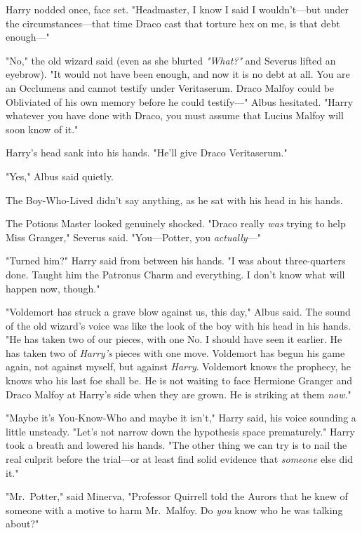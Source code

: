 Harry nodded once, face set. "Headmaster, I know I said I wouldn't---but under
the circumstances---that time Draco cast that torture hex on me, is that debt
enough\mbox{---}"

"No," the old wizard said (even as she blurted \emph{"What?"} and Severus
lifted an eyebrow). "It would not have been enough, and now it is no debt at
all. You are an Occlumens and cannot testify under Veritaserum. Draco Malfoy
could be Obliviated of his own memory before he could testify\mbox{---}" Albus
hesitated. "Harry{\el} whatever you have done with Draco, you must assume
that Lucius Malfoy will soon know of it."

Harry's head sank into his hands. "He'll give Draco Veritaserum."

"Yes," Albus said quietly.

The Boy-Who-Lived didn't say anything, as he sat with his head in his hands.

The Potions Master looked genuinely shocked. "Draco really \emph{was} trying to
help Miss Granger," Severus said. "You---Potter, you \emph{actually}\mbox{---}"

"Turned him?" Harry said from between his hands. "I was about three-quarters
done. Taught him the Patronus Charm and everything. I don't know what will
happen now, though."

"Voldemort has struck a grave blow against us, this day," Albus said. The sound
of the old wizard's voice was like the look of the boy with his head in his hands.
"He has taken two of our pieces, with one{\el} No. I should have seen it
earlier. He has taken two of \emph{Harry's} pieces with one move. Voldemort has
begun his game again, not against myself, but against \emph{Harry}. Voldemort
knows the prophecy, he knows who his last foe shall be. He is not waiting to
face Hermione Granger and Draco Malfoy at Harry's side when they are grown. He
is striking at them \emph{now}."

"Maybe it's You-Know-Who and maybe it isn't," Harry said, his voice sounding a
little unsteady. "Let's not narrow down the hypothesis space prematurely."
Harry took a breath and lowered his hands. "The other thing we can try is to
nail the real culprit before the trial---or at least find solid evidence that
\emph{someone} else did it."

"Mr.~Potter," said Minerva, "Professor Quirrell told the Aurors that he knew of
someone with a motive to harm Mr.~Malfoy. Do \emph{you} know who he was talking
about?"

